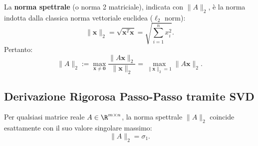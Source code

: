 La \textbf{norma spettrale} (o norma 2 matriciale), indicata con $\|A\|_2$, \`e la norma indotta dalla classica norma vettoriale euclidea ($\ell_2$ norm):
\begin{equation}
    \|\mathbf{x}\|_2 = \sqrt{\mathbf{x}^T \mathbf{x}} = \sqrt{\sum_{i=1}^n x_i^2}.
\end{equation}
Pertanto:
\begin{equation}
    \|A\|_2 := \max_{\mathbf{x} \neq \mathbf{0}} \frac{\|A\mathbf{x}\|_2}{\|\mathbf{x}\|_2} = \max_{\|\mathbf{x}\|_2 = 1} \|A\mathbf{x}\|_2.
\end{equation}

\subsection{Derivazione Rigorosa Passo-Passo tramite SVD}

\begin{theorem}
\label{thm:norma-spettrale-sigma1}
Per qualsiasi matrice reale $A \in \R^{m \times n}$, la norma spettrale $\|A\|_2$ coincide esattamente con il suo valore singolare massimo:
\begin{equation}
    \|A\|_2 = \sigma_1.
\end{equation}
\end{theorem}

